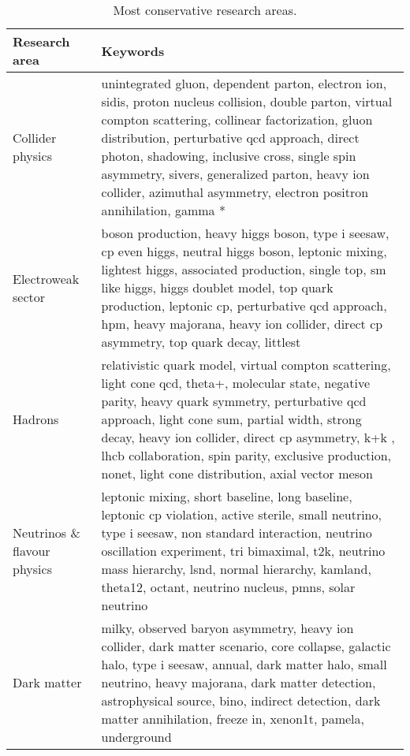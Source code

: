 \begin{table}
\centering
\caption{Most conservative research areas.}
\label{table:most_conservative}
\begin{tabular}{b{}|b{}}
\toprule
               Research area &                                                                                                                                                                                                                                                                                                                                                                               Keywords \\ \hline
\midrule
            Collider physics & unintegrated gluon, dependent parton, electron ion, sidis, proton nucleus collision, double parton, virtual compton scattering, collinear factorization, gluon distribution, perturbative qcd approach, direct photon, shadowing, inclusive cross, single spin asymmetry, sivers, generalized parton, heavy ion collider, azimuthal asymmetry, electron positron annihilation, gamma * \\ \hline
          Electroweak sector &                                  boson production, heavy higgs boson, type i seesaw, cp even higgs, neutral higgs boson, leptonic mixing, lightest higgs, associated production, single top, sm like higgs, higgs doublet model, top quark production, leptonic cp, perturbative qcd approach, hpm, heavy majorana, heavy ion collider, direct cp asymmetry, top quark decay, littlest \\ \hline
                     Hadrons &                 relativistic quark model, virtual compton scattering, light cone qcd, theta+, molecular state, negative parity, heavy quark symmetry, perturbative qcd approach, light cone sum, partial width, strong decay, heavy ion collider, direct cp asymmetry, k+k , lhcb collaboration, spin parity, exclusive production, nonet, light cone distribution, axial vector meson \\ \hline
Neutrinos \& flavour physics &                                                                 leptonic mixing, short baseline, long baseline, leptonic cp violation, active sterile, small neutrino, type i seesaw, non standard interaction, neutrino oscillation experiment, tri bimaximal, t2k, neutrino mass hierarchy, lsnd, normal hierarchy, kamland, theta12, octant, neutrino nucleus, pmns, solar neutrino \\ \hline
                 Dark matter &                                                            milky, observed baryon asymmetry, heavy ion collider, dark matter scenario, core collapse, galactic halo, type i seesaw, annual, dark matter halo, small neutrino, heavy majorana, dark matter detection, astrophysical source, bino, indirect detection, dark matter annihilation, freeze in, xenon1t, pamela, underground \\ \hline
\bottomrule
\end{tabular}
\end{table}
